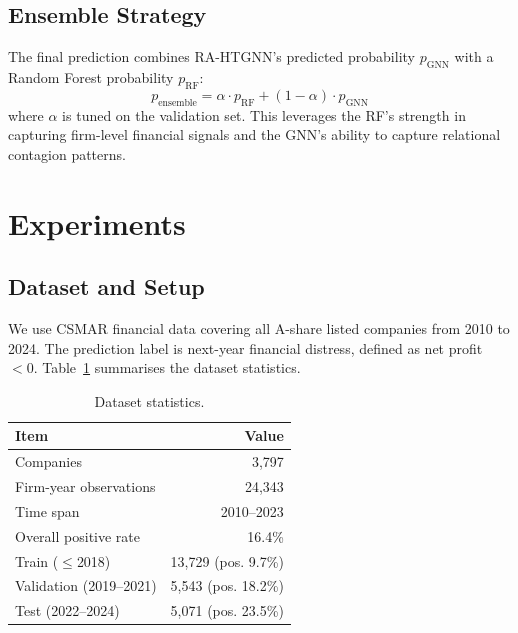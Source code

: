 \documentclass[3p,times,procedia]{elsarticle}
\begin{document}
\subsection{Ensemble Strategy}
\label{subsec:ensemble}

The final prediction combines RA-HTGNN's predicted probability $p_{\text{GNN}}$ with a Random Forest probability $p_{\text{RF}}$:
\begin{equation}
p_{\text{ensemble}} = \alpha \cdot p_{\text{RF}} + (1-\alpha) \cdot p_{\text{GNN}}
\end{equation}
where $\alpha$ is tuned on the validation set. This leverages the RF's strength in capturing firm-level financial signals and the GNN's ability to capture relational contagion patterns.


\section{Experiments}
\label{sec:experiments}

\subsection{Dataset and Setup}
\label{subsec:dataset}

We use CSMAR financial data covering all A-share listed companies from 2010 to 2024.
The prediction label is next-year financial distress, defined as net profit $< 0$.
Table~\ref{tab:dataset} summarises the dataset statistics.

\begin{table}[htbp]
\centering
\caption{Dataset statistics.}\label{tab:dataset}
\begin{tabular}{@{}lr@{}}
\toprule
Item & Value \\
\midrule
Companies & 3{,}797 \\
Firm-year observations & 24{,}343 \\
Time span & 2010--2023 \\
Overall positive rate & 16.4\% \\
\midrule
Train ($\leq$2018) & 13{,}729 (pos. 9.7\%) \\
Validation (2019--2021) & 5{,}543 (pos. 18.2\%) \\
Test (2022--2024) & 5{,}071 (pos. 23.5\%) \\
\bottomrule
\end{tabular}
\end{table}
\end{document}

